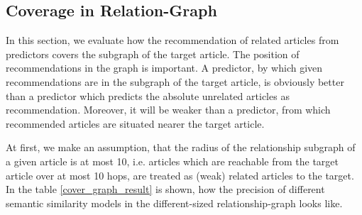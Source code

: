 \subsection{Coverage in Relation-Graph}

In this section, we evaluate how the recommendation of related articles from predictors covers the subgraph of the target article. The position of recommendations in the graph is important. A predictor, by which given recommendations are in the subgraph of the target article, is obviously better than a predictor which predicts the absolute unrelated articles as recommendation. Moreover, it will be weaker than a predictor, from which recommended articles are situated nearer the target article. 

At first, we make an assumption, that the radius of the relationship subgraph of a given article is at most 10, i.e. articles which are reachable from the target article over at most 10 hops, are treated as (weak) related articles to the target. In the table \ref{cover_graph_result} is shown, how the precision of different semantic similarity models in the different-sized relationship-graph looks like. 


